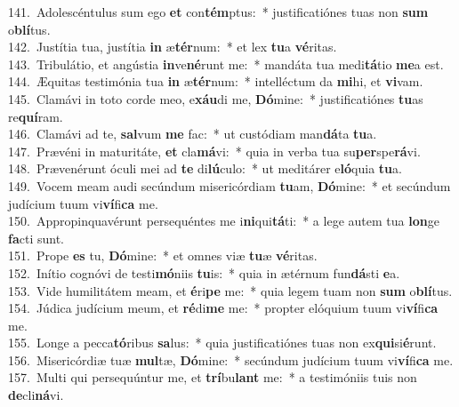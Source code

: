 {141.~}Adolescéntulus sum ego \textbf{et} con\textbf{tém}ptus:~* justificatiónes tuas non \textbf{sum} o\textbf{blí}tus.\\
{142.~}Justítia tua, justítia \textbf{in} æ\textbf{tér}num:~* et lex \textbf{tu}a \textbf{vé}ritas.\\
{143.~}Tribulátio, et angústia \textbf{in}ve\textbf{né}runt me:~* mandáta tua medi\textbf{tá}tio \textbf{me}a est.\\
{144.~}Æquitas testimónia tua \textbf{in} æ\textbf{tér}num:~* intelléctum da \textbf{mi}hi, et \textbf{vi}vam.\\
{145.~}Clamávi in toto corde meo, e\textbf{xáu}di me, \textbf{Dó}mine:~* justificatiónes \textbf{tu}as re\textbf{quí}ram.\\
{146.~}Clamávi ad te, \textbf{sal}vum \textbf{me} fac:~* ut custódiam man\textbf{dá}ta \textbf{tu}a.\\
{147.~}Prævéni in maturitáte, \textbf{et} cla\textbf{má}vi:~* quia in verba tua su\textbf{per}spe\textbf{rá}vi.\\
{148.~}Prævenérunt óculi mei ad \textbf{te} di\textbf{lú}culo:~* ut meditárer e\textbf{ló}quia \textbf{tu}a.\\
{149.~}Vocem meam audi secúndum misericórdiam \textbf{tu}am, \textbf{Dó}mine:~* et secúndum judícium tuum vi\textbf{ví}fi\textbf{ca} me.\\
{150.~}Appropinquavérunt persequéntes me i\textbf{ni}qui\textbf{tá}ti:~* a lege autem tua \textbf{lon}ge \textbf{fa}cti sunt.\\
{151.~}Prope \textbf{es} tu, \textbf{Dó}mine:~* et omnes viæ \textbf{tu}æ \textbf{vé}ritas.\\
{152.~}Inítio cognóvi de testi\textbf{mó}niis \textbf{tu}is:~* quia in ætérnum fun\textbf{dá}sti \textbf{e}a.\\
{153.~}Vide humilitátem meam, et \textbf{é}ri\textbf{pe} me:~* quia legem tuam non \textbf{sum} o\textbf{blí}tus.\\
{154.~}Júdica judícium meum, et \textbf{ré}di\textbf{me} me:~* propter elóquium tuum vi\textbf{ví}fi\textbf{ca} me.\\
{155.~}Longe a pecca\textbf{tó}ribus \textbf{sa}lus:~* quia justificatiónes tuas non ex\textbf{qui}si\textbf{é}runt.\\
{156.~}Misericórdiæ tuæ \textbf{mul}tæ, \textbf{Dó}mine:~* secúndum judícium tuum vi\textbf{ví}fi\textbf{ca} me.\\
{157.~}Multi qui persequúntur me, et \textbf{trí}bu\textbf{lant} me:~* a testimóniis tuis non \textbf{de}cli\textbf{ná}vi.\\
